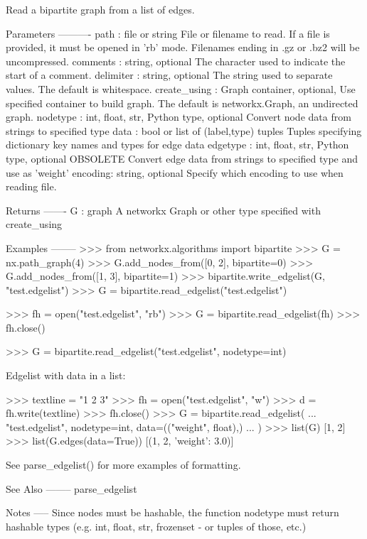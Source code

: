 \begin{DoxyVerb}Read a bipartite graph from a list of edges.

Parameters
----------
path : file or string
   File or filename to read. If a file is provided, it must be
   opened in 'rb' mode.
   Filenames ending in .gz or .bz2 will be uncompressed.
comments : string, optional
   The character used to indicate the start of a comment.
delimiter : string, optional
   The string used to separate values.  The default is whitespace.
create_using : Graph container, optional,
   Use specified container to build graph.  The default is networkx.Graph,
   an undirected graph.
nodetype : int, float, str, Python type, optional
   Convert node data from strings to specified type
data : bool or list of (label,type) tuples
   Tuples specifying dictionary key names and types for edge data
edgetype : int, float, str, Python type, optional OBSOLETE
   Convert edge data from strings to specified type and use as 'weight'
encoding: string, optional
   Specify which encoding to use when reading file.

Returns
-------
G : graph
   A networkx Graph or other type specified with create_using

Examples
--------
>>> from networkx.algorithms import bipartite
>>> G = nx.path_graph(4)
>>> G.add_nodes_from([0, 2], bipartite=0)
>>> G.add_nodes_from([1, 3], bipartite=1)
>>> bipartite.write_edgelist(G, "test.edgelist")
>>> G = bipartite.read_edgelist("test.edgelist")

>>> fh = open("test.edgelist", "rb")
>>> G = bipartite.read_edgelist(fh)
>>> fh.close()

>>> G = bipartite.read_edgelist("test.edgelist", nodetype=int)

Edgelist with data in a list:

>>> textline = "1 2 3"
>>> fh = open("test.edgelist", "w")
>>> d = fh.write(textline)
>>> fh.close()
>>> G = bipartite.read_edgelist(
...     "test.edgelist", nodetype=int, data=(("weight", float),)
... )
>>> list(G)
[1, 2]
>>> list(G.edges(data=True))
[(1, 2, {'weight': 3.0})]

See parse_edgelist() for more examples of formatting.

See Also
--------
parse_edgelist

Notes
-----
Since nodes must be hashable, the function nodetype must return hashable
types (e.g. int, float, str, frozenset - or tuples of those, etc.)
\end{DoxyVerb}
 \mbox{\label{namespacenetworkx_1_1algorithms_1_1bipartite_1_1edgelist_a4a4a5c6bb34fb2d6fc90af46921b9362}} 

